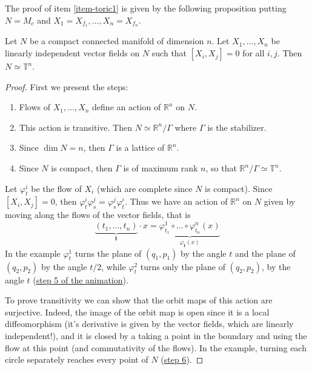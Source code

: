 The proof of item \ref{item-toric1} is given
by
the following proposition
putting $N=M_c$ and
$X_1=X_{f_1},\ldots,X_n=X_{f_n}$.

\begin{proposition}
\label{proposition-torus}
Let $N$ be a compact connected manifold of
dimension $n$.
Let $X_1,\ldots,X_n$ be linearly independent
vector fields on $N$
such that $[X_i,X_j]=0$ for all $i,j$.
Then $N \simeq \mathbb{T}^n$.
\end{proposition}

\begin{proof}
First we present the steps:
\begin{enumerate}
\item Flows of $X_1,\ldots,X_n$ define an
action of $\mathbb{R}^n$ on $N$.

\item This action is transitive. Then $N
\simeq \mathbb{R}^n/\Gamma$
where $\Gamma$ is the stabilizer.

\item Since $\dim N=n$, then  $\Gamma$ is a
lattice of $\mathbb{R}^n$.

\item Since $N$ is compact, then $\Gamma$ is
of maximum rank $n$, so that
$\mathbb{R}^n/\Gamma \simeq \mathbb{T}^n$.
\end{enumerate}


Let $\varphi^i_t$ be the flow of $X_i$ (which
are complete since $N$ is
compact).
Since $[X_i,X_j]=0$, then $\varphi_t^i
\varphi_s^j=\varphi_s^j \varphi^i_t$.
Thus we have an action of $\mathbb{R}^n$ on
$N$
given by moving along the flows of the vector
fields, that is
$$
\underbrace{(t_1,\ldots,t_n)}_{\mathbf{t}}
\cdot
x
=\underbrace{\varphi_{t_1}^1 \circ \ldots
\circ \varphi_{t_n}^n(x)}_{
\varphi_{\mathbf{t}}(x)}
$$
In the example $\varphi^1_t$ turns the plane
of $(q_1,p_1)$ by the angle $t$ and the
plane of $(q_2,p_2)$ by the angle $t/2$,
while $\varphi^2_t$ turns only the plane
of $(q_2,p_2)$, by the angle $t$
(\href{https://www.heap-project.org/models/symplectic-geometry/arnold-liouville-torus.html?step=5}%
{step 5 of the animation}).

To prove transitivity
we can show that the orbit maps of this
action are surjective.
Indeed, the image of the orbit map is open
since it is a local
diffeomorphism (it's derivative is given by
the vector fields,
which are linearly independent!),
and it is closed by a taking a point in the
boundary and
using the flow at this point (and
commutativity of the flows).
In the example, turning each circle
separately reaches every point of $N$
(\href{https://www.heap-project.org/models/symplectic-geometry/arnold-liouville-torus.html?step=6}%
{step 6}).


\end{proof}
